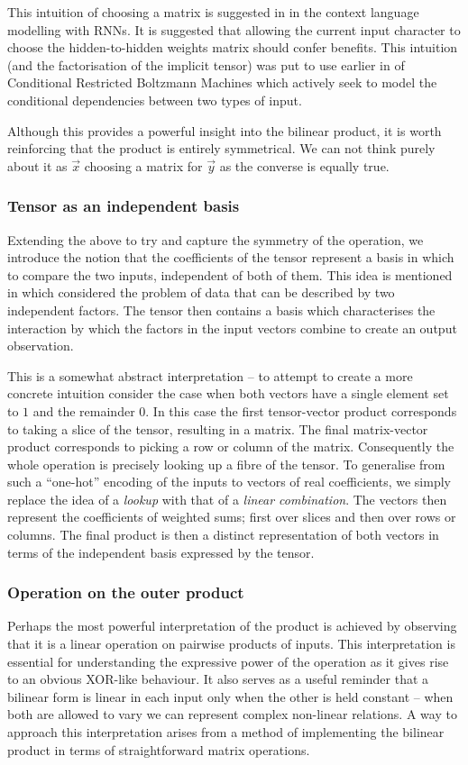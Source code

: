 This intuition of choosing a matrix is suggested in \autocite{Sutskever2013} in the
context language modelling with RNNs. It is suggested that allowing the current input
character to choose the hidden-to-hidden weights matrix should confer benefits. 
This intuition (and the factorisation of the implicit tensor) was put to use earlier in
of Conditional Restricted Boltzmann Machines \autocite{Taylor} which actively seek to model the
conditional dependencies between two types of input.

Although this provides a powerful insight into the bilinear product, it is worth reinforcing that
the product is entirely symmetrical. We can not think purely about it as \(\vec{x}\) choosing a matrix
for \(\vec{y}\) as the converse is equally true.

\subsubsection{Tensor as an independent basis}
Extending the above to try and capture the symmetry of the operation, we introduce
the notion that the coefficients of the tensor represent a basis in which to compare the
two inputs, independent of both of them. This idea is mentioned in
 \autocite{Tenenbaum2000} which considered the problem of data that can be described by two
independent factors.
The tensor then contains a basis which characterises the interaction by which the factors
in the input vectors combine to create an output observation.

This is a somewhat abstract interpretation -- to attempt to create a more concrete
 intuition
consider the case when both vectors have a single element set to \(1\) and the remainder
\(0\). In this case the first tensor-vector product corresponds to taking a slice of the
tensor, resulting in a matrix. The final matrix-vector product corresponds to picking a
row or column of the matrix. Consequently the whole operation is precisely looking up
a fibre of the tensor. To generalise from such a ``one-hot'' encoding of the inputs
to vectors of real coefficients, we simply replace the idea of a
\emph{lookup} with that of a \emph{linear combination}. The vectors then represent the coefficients
of weighted sums; first over slices and then over rows or columns. The final product is then a
distinct representation of both vectors in terms of the independent basis expressed by the tensor.

\subsubsection{Operation on the outer product}
Perhaps the most powerful interpretation of the product is achieved by observing that it is
a linear operation on pairwise products of inputs.
This interpretation is essential for understanding the expressive
power of the operation as it gives rise to an obvious XOR-like behaviour. It also serves
as a useful reminder that a bilinear form is linear in each input only when the other
is held constant -- when both are allowed to vary we can represent complex non-linear
relations.
A way to approach this interpretation arises from a method of implementing the bilinear 
product in terms of straightforward matrix operations.

